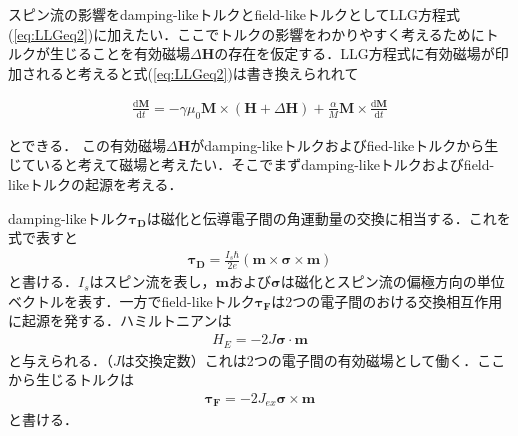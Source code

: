 スピン流の影響をdamping-likeトルクとfield-likeトルクとしてLLG方程式(\ref{eq:LLGeq2})に加えたい．ここでトルクの影響をわかりやすく考えるためにトルクが生じることを有効磁場$\Delta \bm{H}$の存在を仮定する．LLG方程式に有効磁場が印加されると考えると式(\ref{eq:LLGeq2})は書き換えられれて

\begin{eqnarray}
\frac{\mathrm{d}\bm{M}}{\mathrm{d}t}=-\gamma\mu_{0}\bm{M}\times(\bm{H}+\Delta\bm{H})+\frac{\alpha}{M}\bm{M}\times\frac{\mathrm{d}\bm{M}}{\mathrm{d}t}
\label{eq:LLGeq4_0}
\end{eqnarray}

とできる．
この有効磁場$\Delta \bm{H}$がdamping-likeトルクおよびfied-likeトルクから生じていると考えて磁場と考えたい．そこでまずdamping-likeトルクおよびfield-likeトルクの起源を考える．

damping-likeトルク$\bm{\tau_{D}}$は磁化と伝導電子間の角運動量の交換に相当する．これを式で表すと
\begin{eqnarray}
\bm{\tau_{D}} = \frac{I_{s}\hbar}{2e}(\bm{m}\times\bm{\sigma}\times\bm{m})
\label{eq:dtorque}
\end{eqnarray}
と書ける．$I_{s}$はスピン流を表し，$\bm{m}$および$\bm{\sigma}$は磁化とスピン流の偏極方向の単位ベクトルを表す．一方でfield-likeトルク$\bm{\tau_{F}}$は2つの電子間のおける交換相互作用に起源を発する．ハミルトニアンは
\begin{eqnarray}
H_{E} = -2J\bm{\sigma}\cdot\bm{m}
\end{eqnarray}
と与えられる．（$J$は交換定数）これは2つの電子間の有効磁場として働く．ここから生じるトルクは
\begin{eqnarray}
\bm{\tau_{F}} =-2J_{ex}\bm{\sigma}\times\bm{m}
\label{eq:ftorque}
\end{eqnarray}
と書ける．

